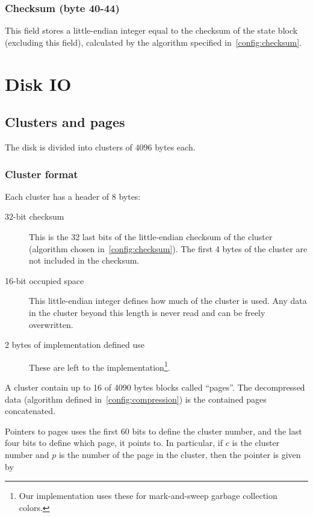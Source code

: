 \documentclass[11pt,a4paper]{report}
\newcommand{\clusterheader}{8 }
\newcommand{\clustersize}{4096 }
\newcommand{\maxpagesincluster}{16 }
\newcommand{\pagesize}{4090 }
\begin{document}
        \subsection{Checksum (byte 40-44)}
        This field stores a little-endian integer equal to the checksum of the
        state block (excluding this field), calculated by the algorithm
        specified in~\ref{config:checksum}.

    \chapter{Disk IO}

    \section{Clusters and pages}
        The disk is divided into clusters of \clustersize bytes each.

        \subsection{Cluster format}
        Each cluster has a header of \clusterheader bytes:

        \begin{description}
            \item [32-bit checksum] This is the 32 last bits of the
                little-endian checksum of the cluster (algorithm
                chosen in~\ref{config:checksum}). The first 4 bytes of
                the cluster are not included in the checksum.
            \item [16-bit occupied space] This little-endian integer defines
                how much of the cluster is used. Any data in the cluster beyond
                this length is never read and can be freely overwritten.
            \item [2 bytes of implementation defined use] These are left to the
                implementation\footnote{Our implementation uses these for
                mark-and-sweep garbage collection colors.}.
        \end{description}

        A cluster contain up to \maxpagesincluster of \pagesize bytes blocks
        called ``pages''. The decompressed data (algorithm defined
        in~\ref{config:compression}) is the contained pages concatenated.

        Pointers to pages uses the first 60 bits to define the cluster number,
        and the last four bits to define which page, it points to. In
        particular, if $c$ is the cluster number and $p$ is the number of the
        page in the cluster, then the pointer is given by
\end{document}
